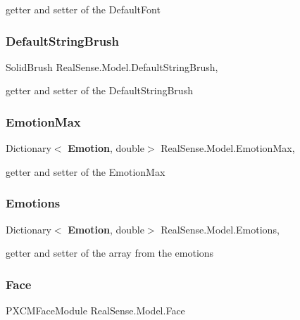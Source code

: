 getter and setter of the Default\+Font \mbox{\label{class_real_sense_1_1_model_aaee076946f30b272e403d39afe033b4e}} 
\subsubsection{Default\+String\+Brush}
{\footnotesize\ttfamily Solid\+Brush Real\+Sense.\+Model.\+Default\+String\+Brush\hspace{0.3cm}{\ttfamily [get]}, {\ttfamily [set]}}

getter and setter of the Default\+String\+Brush \mbox{\label{class_real_sense_1_1_model_ac5454f63dfead405cd1d9c229cf6790f}} 
\subsubsection{Emotion\+Max}
{\footnotesize\ttfamily Dictionary$<$\textbf{ Emotion}, double$>$ Real\+Sense.\+Model.\+Emotion\+Max\hspace{0.3cm}{\ttfamily [get]}, {\ttfamily [set]}}

getter and setter of the Emotion\+Max \mbox{\label{class_real_sense_1_1_model_a30358a7ea8e1e59815e2f562a3fc6bad}} 
\subsubsection{Emotions}
{\footnotesize\ttfamily Dictionary$<$\textbf{ Emotion}, double$>$ Real\+Sense.\+Model.\+Emotions\hspace{0.3cm}{\ttfamily [get]}, {\ttfamily [set]}}

getter and setter of the array from the emotions \mbox{\label{class_real_sense_1_1_model_abb8701f1030ca1e3bfd226a9ad352da5}} 
\subsubsection{Face}
{\footnotesize\ttfamily P\+X\+C\+M\+Face\+Module Real\+Sense.\+Model.\+Face\hspace{0.3cm}{\ttfamily [get]}}


